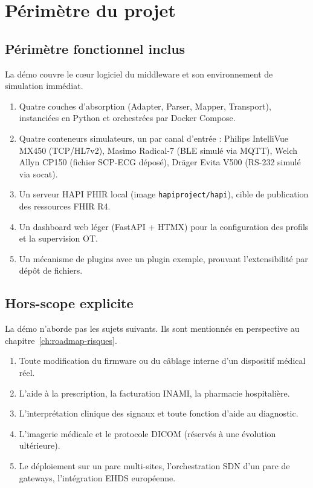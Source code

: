 \chapter{Périmètre du projet}
\label{ch:perimetre}

\section{Périmètre fonctionnel inclus}
\label{sec:in-scope}

La démo couvre le cœur logiciel du middleware et son environnement de simulation immédiat.

\begin{enumerate}
  \item Quatre couches d'absorption (Adapter, Parser, Mapper, Transport), instanciées en Python et orchestrées par Docker Compose.
  \item Quatre conteneurs simulateurs, un par canal d'entrée : Philips IntelliVue MX450 (TCP/HL7v2), Masimo Radical-7 (BLE simulé via MQTT), Welch Allyn CP150 (fichier SCP-ECG déposé), Dräger Evita V500 (RS-232 simulé via socat).
  \item Un serveur HAPI FHIR local (image \texttt{hapiproject/hapi}), cible de publication des ressources FHIR R4.
  \item Un dashboard web léger (FastAPI + HTMX) pour la configuration des profils et la supervision OT.
  \item Un mécanisme de plugins avec un plugin exemple, prouvant l'extensibilité par dépôt de fichiers.
\end{enumerate}

\section{Hors-scope explicite}
\label{sec:out-scope}

La démo n'aborde pas les sujets suivants. Ils sont mentionnés en perspective au chapitre~\ref{ch:roadmap-risques}.

\begin{enumerate}
  \item Toute modification du firmware ou du câblage interne d'un dispositif médical réel.
  \item L'aide à la prescription, la facturation INAMI, la pharmacie hospitalière.
  \item L'interprétation clinique des signaux et toute fonction d'aide au diagnostic.
  \item L'imagerie médicale et le protocole DICOM (réservés à une évolution ultérieure).
  \item Le déploiement sur un parc multi-sites, l'orchestration SDN d'un parc de gateways, l'intégration EHDS européenne.
\end{enumerate}

